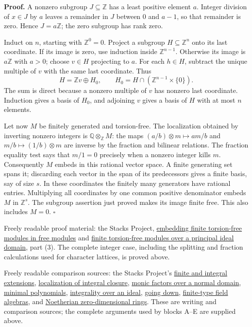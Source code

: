 \documentclass[11pt,a4paper,openany]{report}
\begin{document}
\textbf{Proof.} A nonzero subgroup \(J\subseteq\mathbb Z\) has a least positive element \(a\). Integer division of \(x\in J\) by \(a\) leaves a remainder in \(J\) between \(0\) and \(a-1\), so that remainder is zero. Hence \(J=a\mathbb Z\); the zero subgroup has rank zero.

Induct on \(n\), starting with \(\mathbb Z^0=0\). Project a subgroup \(H\subseteq\mathbb Z^n\) onto its last coordinate. If its image is zero, use induction inside \(\mathbb Z^{n-1}\). Otherwise its image is \(a\mathbb Z\) with \(a>0\); choose \(v\in H\) projecting to \(a\). For each \(h\in H\), subtract the unique multiple of \(v\) with the same last coordinate. Thus \[
H=\mathbb Z v\oplus H_0,\qquad H_0=H\cap(\mathbb Z^{n-1}\times\{0\}).
\] The sum is direct because a nonzero multiple of \(v\) has nonzero last coordinate. Induction gives a basis of \(H_0\), and adjoining \(v\) gives a basis of \(H\) with at most \(n\) elements.

Let now \(M\) be finitely generated and torsion-free. The localization obtained by inverting nonzero integers is \(\mathbb Q\otimes_{\mathbb Z}M\): the maps \((a/b)\otimes m\mapsto am/b\) and \(m/b\mapsto(1/b)\otimes m\) are inverse by the fraction and bilinear relations. The fraction equality test says that \(m/1=0\) precisely when a nonzero integer kills \(m\). Consequently \(M\) embeds in this rational vector space. A finite generating set spans it; discarding each vector in the span of its predecessors gives a finite basis, say of size \(s\). In these coordinates the finitely many generators have rational entries. Multiplying all coordinates by one common positive denominator embeds \(M\) in \(\mathbb Z^s\). The subgroup assertion just proved makes its image finite free. This also includes \(M=0\). \(\square\)

Freely readable proof material: the Stacks Project, \href{https://stacks.math.columbia.edu/tag/0AUU}{embedding finite torsion-free modules in free modules} and \href{https://stacks.math.columbia.edu/tag/0AUW}{finite torsion-free modules over a principal ideal domain}, part (3). The complete integer case, including the splitting and fraction calculations used for character lattices, is proved above.

Freely readable comparison sources: the Stacks Project's \href{https://stacks.math.columbia.edu/tag/00GH}{finite and integral extensions}, \href{https://stacks.math.columbia.edu/tag/0307}{localization of integral closure}, \href{https://stacks.math.columbia.edu/tag/00H6}{monic factors over a normal domain}, \href{https://stacks.math.columbia.edu/tag/00H7}{minimal polynomials}, \href{https://stacks.math.columbia.edu/tag/00H5}{integrality over an ideal}, \href{https://stacks.math.columbia.edu/tag/00H8}{going down}, \href{https://stacks.math.columbia.edu/tag/00FV}{finite-type field algebras}, and \href{https://stacks.math.columbia.edu/tag/00KH}{Noetherian zero-dimensional rings}. These are writing and comparison sources; the complete arguments used by blocks A--E are supplied above.
\end{document}
